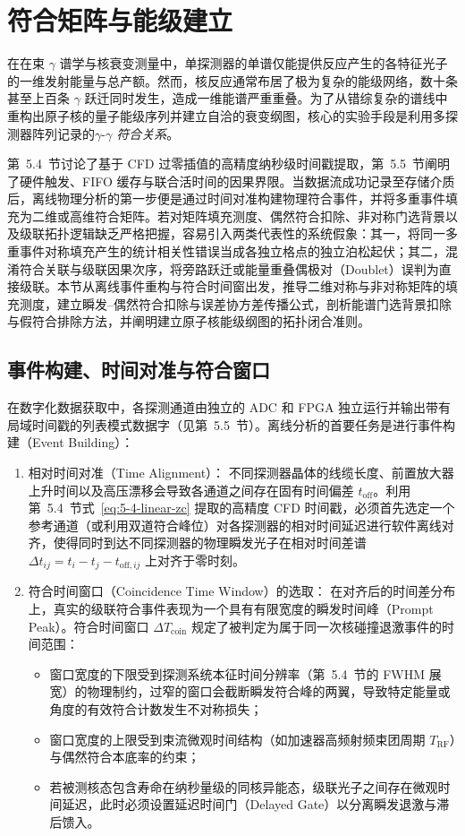 \section{符合矩阵与能级建立}\label{sec:5-6}

在在束 $\gamma$ 谱学与核衰变测量中，单探测器的单谱仅能提供反应产生的各特征光子的一维发射能量与总产额。然而，核反应通常布居了极为复杂的能级网络，数十条甚至上百条 $\gamma$ 跃迁同时发生，造成一维能谱严重重叠。为了从错综复杂的谱线中重构出原子核的量子能级序列并建立自洽的衰变纲图，核心的实验手段是利用多探测器阵列记录的\emph{$\gamma\text{-}\gamma$ 符合关系}。

第~5.4~节讨论了基于 CFD 过零插值的高精度纳秒级时间戳提取，第~5.5~节阐明了硬件触发、FIFO 缓存与联合活时间的因果界限。当数据流成功记录至存储介质后，离线物理分析的第一步便是通过时间对准构建物理符合事件，并将多重事件填充为二维或高维符合矩阵。若对矩阵填充测度、偶然符合扣除、非对称门选背景以及级联拓扑逻辑缺乏严格把握，容易引入两类代表性的系统假象：其一，将同一多重事件对称填充产生的统计相关性错误当成各独立格点的独立泊松起伏；其二，混淆符合关联与级联因果次序，将旁路跃迁或能量重叠偶极对（Doublet）误判为直接级联。本节从离线事件重构与符合时间窗出发，推导二维对称与非对称矩阵的填充测度，建立瞬发--偶然符合扣除与误差协方差传播公式，剖析能谱门选背景扣除与假符合排除方法，并阐明建立原子核能级纲图的拓扑闭合准则。

\subsection{事件构建、时间对准与符合窗口}\label{subsec:5-6-1}

在数字化数据获取中，各探测通道由独立的 ADC 和 FPGA 独立运行并输出带有局域时间戳的列表模式数据字（见第~5.5~节）。离线分析的首要任务是进行事件构建（Event Building）：
\begin{enumerate}
\item 相对时间对准（Time Alignment）：
不同探测器晶体的线缆长度、前置放大器上升时间以及高压漂移会导致各通道之间存在固有时间偏差 $t_{\mathrm{off}}$。利用第~5.4~节式~\eqref{eq:5-4-linear-zc} 提取的高精度 CFD 时间戳，必须首先选定一个参考通道（或利用双道符合峰位）对各探测器的相对时间延迟进行软件离线对齐，使得同时到达不同探测器的物理瞬发光子在相对时间差谱 $\Delta t_{ij} = t_i - t_j - t_{\mathrm{off}, ij}$ 上对齐于零时刻。
\item 符合时间窗口（Coincidence Time Window）的选取：
在对齐后的时间差分布上，真实的级联符合事件表现为一个具有有限宽度的瞬发时间峰（Prompt Peak）。符合时间窗口 $\Delta T_{\mathrm{coin}}$ 规定了被判定为属于同一次核碰撞退激事件的时间范围：
\begin{itemize}
\item 窗口宽度的下限受到探测系统本征时间分辨率（第~5.4~节的 FWHM 展宽）的物理制约，过窄的窗口会截断瞬发符合峰的两翼，导致特定能量或角度的有效符合计数发生不对称损失；
\item 窗口宽度的上限受到束流微观时间结构（如加速器高频射频束团周期 $T_{\mathrm{RF}}$）与偶然符合本底率的约束；
\item 若被测核态包含寿命在纳秒量级的同核异能态，级联光子之间存在微观时间延迟，此时必须设置延迟时间门（Delayed Gate）以分离瞬发退激与滞后馈入。
\end{itemize}
\end{enumerate}

